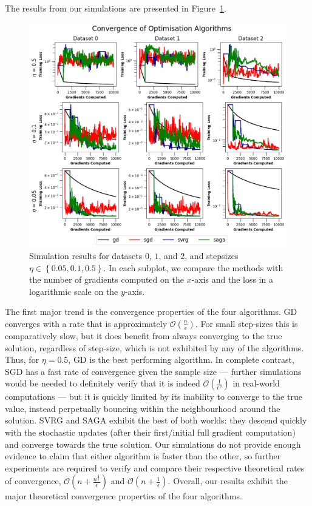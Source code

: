 The results from our simulations are presented in Figure~\ref{fig:sims_results}.
\begin{figure}[h]
    \centering
    \includegraphics[width=0.85\linewidth]{assets/total_plot.png}
    \caption{Simulation results for datasets $0$, $1$, and $2$, and stepsizes $\eta \in \left\{0.05, 0.1, 0.5\right\}$. In each subplot, we compare the methods with the number of gradients computed on the $x$-axis and the loss in a logarithmic scale on the $y$-axis.}
    \label{fig:sims_results}
\end{figure}
The first major trend is the convergence properties of the four algorithms. GD converges with a rate that is approximately $\mathcal{O}\left(\frac{n}{\epsilon}\right)$. For small step-sizes this is comparatively slow, but it does benefit from always converging to the true solution, regardless of step-size, which is not exhibited by any of the algorithms. Thus, for $\eta = 0.5$, GD is the best performing algorithm. In complete contrast, SGD has a fast rate of convergence given the sample size --- further simulations would be needed to definitely verify that it is indeed $\mathcal{O}\left(\frac{1}{\epsilon^2}\right)$ in real-world computations --- but it is quickly limited by its inability to converge to the true value, instead perpetually bouncing within the neighbourhood around the solution. SVRG and SAGA exhibit the best of both worlds: they descend quickly with the stochastic updates (after their first/initial full gradient computation) and converge towards the true solution. Our simulations do not provide enough evidence to claim that either algorithm is faster than the other, so further experiments are required to verify and compare their respective theoretical rates of convergence, $\mathcal{O}\left(n + \frac{n^{\frac{2}{3}}}{\epsilon}\right)$ and $\mathcal{O}\left(n + \frac{1}{\epsilon}\right)$. Overall, our results exhibit the major theoretical convergence properties of the four algorithms.

